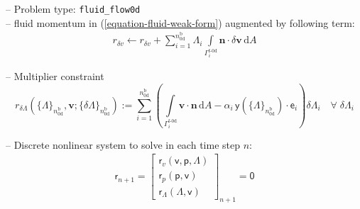 \documentclass[a4paper,12pt]{report}
\newcommand{\bs}[1]{\boldsymbol{#1}}
\newcommand{\ROP}{\bs{\mathsf{r}}}
\newcommand{\LMZ}{\bs{\mathsf{\Lambda}}}
\begin{document}
-- Problem type: \verb.fluid_flow0d.\\

-- fluid momentum in (\ref{equation-fluid-weak-form}) augmented by following term:
\begin{equation}
\begin{aligned}
r_{\delta v} \leftarrow r_{\delta v} + \sum\limits_{i=1}^{{n}_{\text{0d}}^{\text{b}}}\mathit{\Lambda}_{i}\int\limits_{\mathit{\Gamma}_{i}^{\text{f-0d}}} \boldsymbol{n}\cdot\delta\boldsymbol{v}\,\mathrm{d}A
\end{aligned}
\end{equation}

-- Multiplier constraint
\begin{equation}
r_{\delta\mathit{\Lambda}}\left(\{\mathit{\Lambda}\}_{n_{\text{0d}}^{\text{b}}},\boldsymbol{v};\{\delta\mathit{\Lambda}\}_{n_{\text{0d}}^{\text{b}}}\right) := \sum\limits_{i=1}^{n_{\text{0d}}^{\text{b}}}\left(\int\limits_{\mathit{\Gamma}_{i}^{\text{f-0d}}} \boldsymbol{v}\cdot\boldsymbol{n}\,\mathrm{d}A - \alpha_{i} \,\boldsymbol{\mathsf{y}}\left(\{\mathit{\Lambda}\}_{n_{\text{0d}}^{\text{b}}}\right)\cdot\boldsymbol{\mathsf{e}}_{i}\right)\delta\mathit{\Lambda}_{i} \quad \forall \; \delta\mathit{\Lambda}_i
\end{equation}

-- Discrete nonlinear system to solve in each time step $n$:
\begin{equation}
\label{equation-nonlin-sys-fluid-0d}
\begin{aligned}
\ROP_{n+1} = \begin{bmatrix} \ROP_{v}(\boldsymbol{\mathsf{v}},\boldsymbol{\mathsf{p}},\LMZ) \\ \ROP_{p}(\boldsymbol{\mathsf{p}},\boldsymbol{\mathsf{v}}) \\ \ROP_{\mathit{\Lambda}}(\LMZ,\boldsymbol{\mathsf{v}}) \end{bmatrix}_{n+1} = \boldsymbol{\mathsf{0}}
\end{aligned}
\end{equation}
\end{document}
